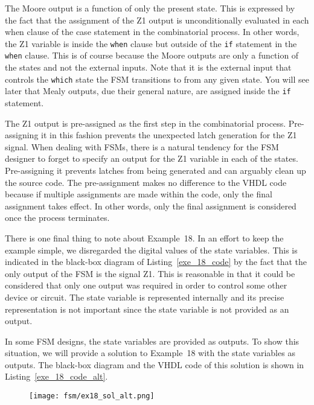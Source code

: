 \begin{my_list}
\item The Moore output is a function of only the present state. This is expressed by the fact that the assignment of the Z1 output is unconditionally evaluated in each when clause of the case statement in the combinatorial process. In other words, the Z1 variable is inside the \texttt{when} clause but outside of the \texttt{if} statement in the \texttt{when} clause. This is of course because the Moore outputs are only a function of the states and not the external inputs. Note that it is the external input that controls the \texttt{which} state the FSM transitions to from any given state. You will see later that Mealy outputs, due their general nature, are assigned inside the \texttt{if} statement.

\item The Z1 output is pre-assigned as the first step in the combinatorial process. Pre-assigning it in this fashion prevents the unexpected latch generation for the Z1 signal. When dealing with FSMs, there is a natural tendency for the FSM designer to forget to specify an output for the Z1 variable in each of the states. Pre-assigning it prevents latches from being generated and can arguably clean up the source code. The pre-assignment makes no difference to the VHDL code because if multiple assignments are made within the code, only the final assignment takes effect. In other words, only the final assignment is considered once the process terminates. 
\end{my_list}

There is one final thing to note about Example~18. In an effort to keep the example simple, we disregarded the digital values of the state variables. This is indicated in the black-box diagram of Listing~\ref{exe_18_code} by the fact that the only output of the FSM is the signal Z1. This is reasonable in that it could be considered that only one output was required in order to control some other device or circuit. The state variable is represented internally and its precise representation is not important since the state variable is not provided as an output. 

In some FSM designs, the state variables are provided as outputs. To show this situation, we will provide a solution to Example~18 with the state variables as outputs. The black-box diagram and the VHDL code of this solution is shown in Listing~\ref{exe_18_code_alt}.
\begin{figure}[!h]
    \centering
	\texttt{[image: fsm/ex18\_sol\_alt.png]}
\end{figure}

